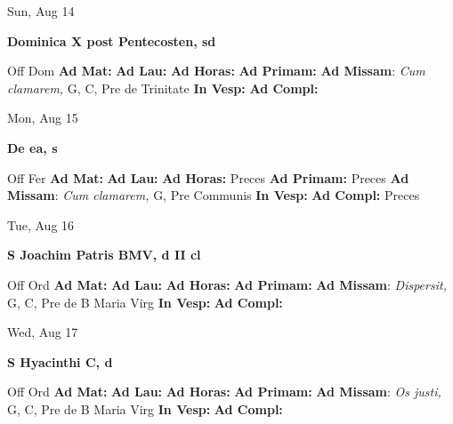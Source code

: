 \documentclass[10pt]{article}
\begin{document}
\begin{minipage}{3.5in}
\vspace{2em}\begin{center}
Sun, Aug 14
\end{center}\textbf{ \large Dominica X post Pentecosten, \textnormal{\normalsize sd}}
\begin{justify}
Off Dom
\textbf{Ad Mat: }
\textbf{Ad Lau: }
\textbf{Ad Horas: }
\textbf{Ad Primam: }
\textbf{Ad Missam}: \textit{Cum clamarem,} G, C, Pre de Trinitate
\textbf{In Vesp: }
\textbf{Ad Compl: }\end{justify}
\end{minipage}



\begin{minipage}{3.5in}
\vspace{2em}\begin{center}
Mon, Aug 15
\end{center}\textbf{ \large De ea, \textnormal{\normalsize s}}
\begin{justify}
Off Fer
\textbf{Ad Mat: }
\textbf{Ad Lau: }
\textbf{Ad Horas: }Preces
\textbf{Ad Primam: }Preces
\textbf{Ad Missam}: \textit{Cum clamarem,} G, Pre Communis
\textbf{In Vesp: }
\textbf{Ad Compl: }Preces\end{justify}
\end{minipage}



\begin{minipage}{3.5in}
\vspace{2em}\begin{center}
Tue, Aug 16
\end{center}\textbf{ \large S Joachim Patris BMV, \textnormal{\normalsize d II cl}}
\begin{justify}
Off Ord
\textbf{Ad Mat: }
\textbf{Ad Lau: }
\textbf{Ad Horas: }
\textbf{Ad Primam: }
\textbf{Ad Missam}: \textit{Dispersit,} G, C, Pre de B Maria Virg
\textbf{In Vesp: }
\textbf{Ad Compl: }\end{justify}
\end{minipage}



\begin{minipage}{3.5in}
\vspace{2em}\begin{center}
Wed, Aug 17
\end{center}\textbf{ \large S Hyacinthi C, \textnormal{\normalsize d}}
\begin{justify}
Off Ord
\textbf{Ad Mat: }
\textbf{Ad Lau: }
\textbf{Ad Horas: }
\textbf{Ad Primam: }
\textbf{Ad Missam}: \textit{Os justi,} G, C, Pre de B Maria Virg
\textbf{In Vesp: }
\textbf{Ad Compl: }\end{justify}
\end{minipage}
\end{document}
